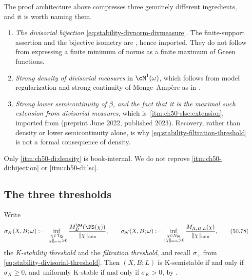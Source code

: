 \begin{remark}
\label{rem:ch50-divisorial-inputs}
The proof architecture above compresses three genuinely different
ingredients, and it is worth naming them.
\begin{enumerate}
\item\label{itm:ch50-di:bijection}
      \emph{The divisorial bijection} \eqref{eq:stability-divnorm-divmeasure}.
      The finite-support assertion and the bijective isometry are
      \cite[Theorem~7.13 and Corollary~7.16]{BJKS1}, hence imported.
      They do not follow from expressing a finite minimum of norms as
      a finite maximum of Green functions.
\item\label{itm:ch50-di:density}
      \emph{Strong density of divisorial measures} in
      $\cM^1(\omega)$, which follows from model regularization and strong continuity of
      Monge--Amp\`ere as in .
\item\label{itm:ch50-di:lsc}
      \emph{Strong lower semicontinuity of $\beta$, and the fact that
      it is the maximal such extension from divisorial measures}, which
      is \,\cref{itm:ch50-slsc:extension},
      imported from \cite[\S\S3.4 and 4.1]{BJKS2} (preprint June 2022,
      published 2023).  Recovery, rather than density or lower semicontinuity alone, is why
      \eqref{eq:stability-filtration-threshold} is not a formal
      consequence of density.
\end{enumerate}
Only \cref{itm:ch50-di:density} is book-internal.  We do not reprove
\cref{itm:ch50-di:bijection} or \cref{itm:ch50-di:lsc}.
\end{remark}

\subsection{The three thresholds}
\label{sec:ch50-thresholds}

Write
\[
 \sigma_K(X,B;\omega)
 :=\inf_{\substack{\chi\in\mathcal T_{\mathbf Q}\\
        \|\chi\|_{\min}>0}}
      \frac{M^{\NA}_B(\FS(\chi))}{\|\chi\|_{\min}},
 \qquad
 \sigma_{\mathcal N}(X,B;\omega)
 :=\inf_{\substack{\chi\in\mathcal N_{\mathbf R}\\
        \|\chi\|_{\min}>0}}
      \frac{M_{X,B;L}(\chi)}{\|\chi\|_{\min}} ,
\tag{50.78}\label{eq:ch50-three-thresholds}
\]
the \emph{K-stability threshold} and the \emph{filtration threshold}, and
recall $\sigma_{\div}$ from
\eqref{eq:stability-divisorial-threshold}.  Then
$(X,B;L)$ is K-semistable if and only if $\sigma_K\ge0$, and uniformly
K-stable if and only if $\sigma_K>0$, by
.


